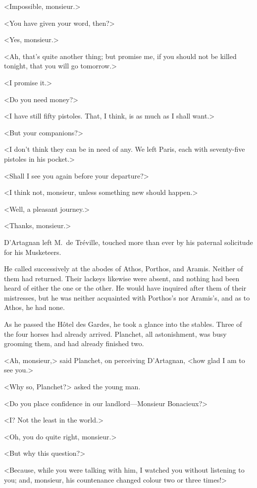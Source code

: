 <Impossible, monsieur.> 

<You have given your word, then?> 

<Yes, monsieur.> 

<Ah, that's quite another thing; but promise me, if you should not be killed tonight, that you will go tomorrow.> 

<I promise it.> 

<Do you need money?> 

<I have still fifty pistoles. That, I think, is as much as I shall want.> 

<But your companions?> 

<I don't think they can be in need of any. We left Paris, each with seventy-five pistoles in his pocket.> 

<Shall I see you again before your departure?> 

<I think not, monsieur, unless something new should happen.> 

<Well, a pleasant journey.> 

<Thanks, monsieur.> 

D'Artagnan left M.~de Tréville, touched more than ever by his paternal solicitude for his Musketeers. 

He called successively at the abodes of Athos, Porthos, and Aramis. Neither of them had returned. Their lackeys likewise were absent, and nothing had been heard of either the one or the other. He would have inquired after them of their mistresses, but he was neither acquainted with Porthos's nor Aramis's, and as to Athos, he had none. 

As he passed the Hôtel des Gardes, he took a glance into the stables. Three of the four horses had already arrived. Planchet, all astonishment, was busy grooming them, and had already finished two. 

<Ah, monsieur,> said Planchet, on perceiving D'Artagnan, <how glad I am to see you.> 

<Why so, Planchet?> asked the young man. 

<Do you place confidence in our landlord—Monsieur Bonacieux?> 

<I? Not the least in the world.> 

<Oh, you do quite right, monsieur.> 

<But why this question?> 

<Because, while you were talking with him, I watched you without listening to you; and, monsieur, his countenance changed colour two or three times!> 

